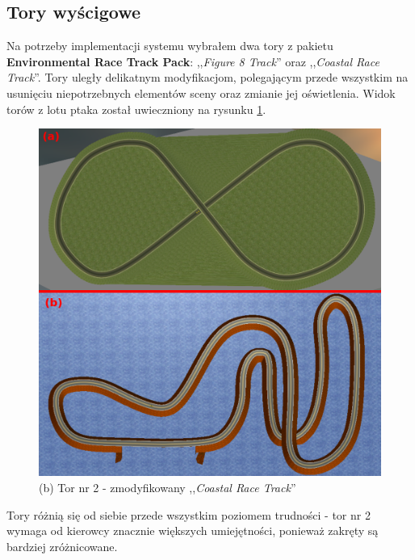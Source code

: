 \newpage
\subsection{Tory wyścigowe}
\label{RaceTracksSection}
Na potrzeby implementacji systemu wybrałem dwa tory z pakietu \textbf{Environmental Race Track Pack}: ,,\textit{Figure 8 Track}'' oraz ,,\textit{Coastal Race Track}''. Tory uległy delikatnym modyfikacjom, polegającym przede wszystkim na usunięciu niepotrzebnych elementów sceny oraz zmianie jej oświetlenia. Widok torów z lotu ptaka został uwieczniony na rysunku \ref{RaceTracksFig}. \\

\begin{figure}[h]
\begin{center}
\includegraphics[width=14.5cm]{resources/figures/race_tracks_marked.png}
\caption{Tory wyścigowe wykorzystane w projekcie.}
\vspace*{-0.3cm}
\caption*{(a) Tor nr 1 - zmodyfikowany ,,\textit{Figure 8 Track}''}
\vspace*{-0.3cm}
\caption*{(b) Tor nr 2 - zmodyfikowany ,,\textit{Coastal Race Track}''}
\label{RaceTracksFig}
\end{center}
\end{figure}

\vspace{-0.5cm}
Tory różnią się od siebie przede wszystkim poziomem trudności - tor nr 2 wymaga od kierowcy znacznie większych umiejętności, ponieważ zakręty są bardziej zróżnicowane.

